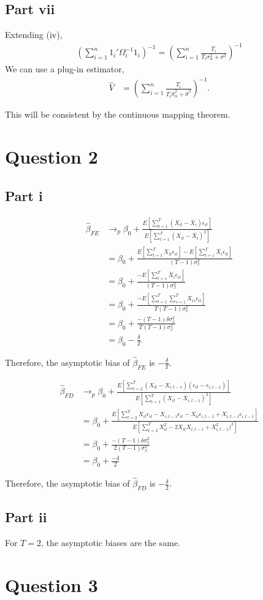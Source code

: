 \documentclass[11pt]{article} %
\begin{document}
\subsection{Part vii}

Extending (iv),
\begin{align*}
\left( \sum_{i=1}^n 1_i'\Omega_i^{-1}1_i\right)^{-1} = \left( \sum_{i=1}^n \frac{T_i}{T_i\sigma_{\alpha}^2 + \sigma^2} \right)^{-1}
\end{align*}
We can use a plug-in estimator,
\begin{align*}
\hat{V} &= \left( \sum_{i=1}^n \frac{T_i}{T_i\hat{\sigma}_{\alpha}^2 + \hat{\sigma}^2} \right)^{-1}.
\end{align*}

This will be consistent by the continuous mapping theorem.
\section{Question 2}
\subsection{Part i}
\begin{align*}
\hat{\beta}_{FE} &\rightarrow_p \beta_0 + \frac{E[\sum_{t=1}^T (X_{it} - \bar{X}_i)\epsilon_{it}]}{E[\sum_{t=1}^T(X_{it} - \bar{X}_i)^2]}\\
&=  \beta_0 + \frac{E[\sum_{t=1}^T X_{it}\epsilon_{it}] - E[\sum_{t=1}^T\bar{X}_i\epsilon_{it}]}{(T-1)\sigma_x^2} \\
&=  \beta_0 + \frac{- E[\sum_{t=1}^T\bar{X}_i\epsilon_{it}]}{(T-1)\sigma_x^2} \\
&= \beta_0 + \frac{- E[\sum_{t=1}^T\sum_{s=1}^TX_{is}\epsilon_{it}]}{T(T-1)\sigma_x^2}\\ 
&= \beta_0 + \frac{- (T-1)\delta\sigma^2_x}{T(T-1)\sigma_x^2}\\
&= \beta_0 - \frac{\delta}{T}
\end{align*}

Therefore, the asymptotic bias of $\hat{\beta}_{FE}$ is $-\frac{\delta}{T}$.

\begin{align*}
\hat{\beta}_{FD} &\rightarrow_p \beta_0 + \frac{E[\sum_{t=2}^T (X_{it} - X_{i,t-1})(\epsilon_{it} - \epsilon_{i,t-1})]}{E[\sum_{t=1}^T(X_{it} - X_{i,t-1})^2]}\\
&= \beta_0 + \frac{E[\sum_{t=2}^T X_{it}\epsilon_{it} - X_{i,t-1}\epsilon_{it} -X_{it}\epsilon_{i,t-1} + X_{i,t-1}\epsilon_{i,t-1} ]}{E[\sum_{t=2}^TX^2_{it} - 2X_{it}X_{i,t-1} + X_{i,t-1}^2)^2]}\\
&= \beta_0 + \frac{-(T-1)\delta \sigma_{x}^2  }{2(T-1)\sigma_x^2}\\
&= \beta_0 + \frac{-\delta  }{2}
\end{align*}

Therefore, the asymptotic bias of $\hat{\beta}_{FD}$ is $-\frac{\delta}{2}$.

\subsection{Part ii}

For $T=2$, the asymptotic biases are the same.
\section{Question 3}
\end{document}
